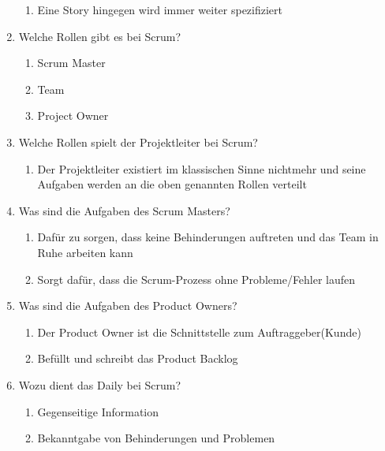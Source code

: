 \documentclass[12pt,a4paper]{article}
\begin{document}
\begin{enumerate}
\begin{enumerate}
		\item Eine Story hingegen wird immer weiter spezifiziert
	\end{enumerate}
	\item Welche Rollen gibt es bei Scrum?
	\begin{enumerate}
		\item Scrum Master
		\item Team 
		\item Project Owner
	\end{enumerate}
	\item Welche Rollen spielt der Projektleiter bei Scrum?
	\begin{enumerate}
		\item Der Projektleiter existiert im klassischen Sinne nichtmehr und seine Aufgaben werden an die oben genannten Rollen verteilt
	\end{enumerate}
	\item Was sind die Aufgaben des Scrum Masters?
	\begin{enumerate}
		\item Dafür zu sorgen, dass keine Behinderungen auftreten und das Team in Ruhe arbeiten kann
		\item Sorgt dafür, dass die Scrum-Prozess ohne Probleme/Fehler laufen
	\end{enumerate}
	\item Was sind die Aufgaben des Product Owners?
	\begin{enumerate}
		\item Der Product Owner ist die Schnittstelle zum Auftraggeber(Kunde)
		\item Befüllt und schreibt das Product Backlog
	\end{enumerate}
	\item Wozu dient das Daily bei Scrum?
	\begin{enumerate}
		\item Gegenseitige Information
		\item Bekanntgabe von Behinderungen und Problemen
	\end{enumerate}
\end{enumerate}
\end{document}
